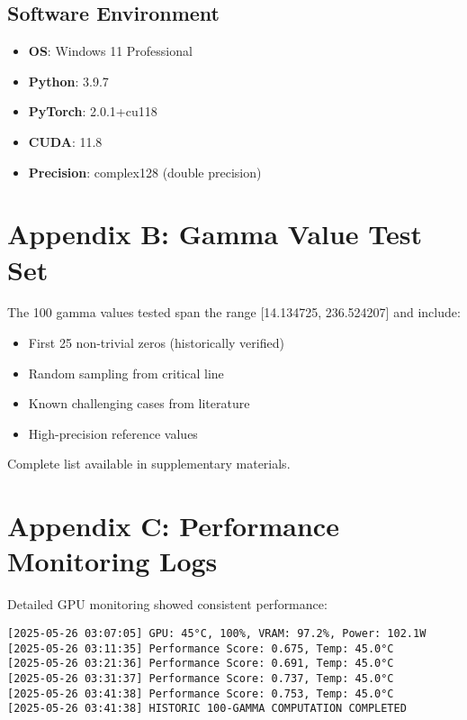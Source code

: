 \documentclass[12pt,a4paper]{article}
\begin{document}
\subsection{Software Environment}
\begin{itemize}
\item \textbf{OS}: Windows 11 Professional
\item \textbf{Python}: 3.9.7
\item \textbf{PyTorch}: 2.0.1+cu118
\item \textbf{CUDA}: 11.8
\item \textbf{Precision}: complex128 (double precision)
\end{itemize}

\section{Appendix B: Gamma Value Test Set}

The 100 gamma values tested span the range [14.134725, 236.524207] and include:
\begin{itemize}
\item First 25 non-trivial zeros (historically verified)
\item Random sampling from critical line
\item Known challenging cases from literature
\item High-precision reference values
\end{itemize}

Complete list available in supplementary materials.

\section{Appendix C: Performance Monitoring Logs}

Detailed GPU monitoring showed consistent performance:
\begin{verbatim}
[2025-05-26 03:07:05] GPU: 45°C, 100%, VRAM: 97.2%, Power: 102.1W
[2025-05-26 03:11:35] Performance Score: 0.675, Temp: 45.0°C
[2025-05-26 03:21:36] Performance Score: 0.691, Temp: 45.0°C
[2025-05-26 03:31:37] Performance Score: 0.737, Temp: 45.0°C
[2025-05-26 03:41:38] Performance Score: 0.753, Temp: 45.0°C
[2025-05-26 03:41:38] HISTORIC 100-GAMMA COMPUTATION COMPLETED
\end{verbatim}
\end{document}
